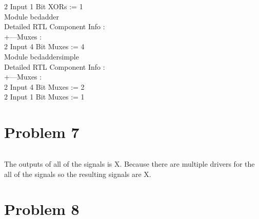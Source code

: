 \documentclass[paper=a4, fontsize=11pt]{scrartcl} %
\numberwithin{equation}{section} %
\numberwithin{figure}{section} %
\numberwithin{table}{section} %
\begin{document}
	   2 Input      1 Bit         XORs := 1 \\
Module bcdadder                             \\
Detailed RTL Component Info :               \\
+---Muxes :                                 \\
	   2 Input      4 Bit        Muxes := 4 \\
Module bcdaddersimple                       \\
Detailed RTL Component Info :               \\
+---Muxes :                                 \\
	   2 Input      4 Bit        Muxes := 2 \\
	   2 Input      1 Bit        Muxes := 1

\section{Problem 7}
\inputminted{vhdl}{q7/test/simulate.vhd}
\par The outputs of all of the signals is X. Because there are multiple drivers
for the all of the signals so the resulting signals are X.

\section{Problem 8}
\inputminted{vhdl}{q7/test/simulate.vhd}
\end{document}
